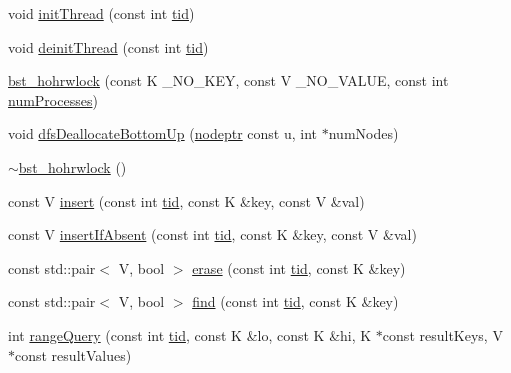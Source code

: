 \begin{DoxyCompactItemize}
\item 
void \hyperlink{classbst__hohrwlock__ns_1_1bst__hohrwlock_a594fc73b875a953bbbabe66ad1fd486f}{init\+Thread} (const int \hyperlink{microbench_2main_8cpp_a9ca9869868fe7e7a38a921cc7de4103f}{tid})
\item 
void \hyperlink{classbst__hohrwlock__ns_1_1bst__hohrwlock_a6238bfcad20d51e4b3522a51c9b41021}{deinit\+Thread} (const int \hyperlink{microbench_2main_8cpp_a9ca9869868fe7e7a38a921cc7de4103f}{tid})
\item 
\hyperlink{classbst__hohrwlock__ns_1_1bst__hohrwlock_a2971cc13e0041afd83bd6f0393b66e55}{bst\+\_\+hohrwlock} (const K \+\_\+\+N\+O\+\_\+\+K\+EY, const V \+\_\+\+N\+O\+\_\+\+V\+A\+L\+UE, const int \hyperlink{testing_8cpp_aa085812188e21ede75351d88b9b2c30d}{num\+Processes})
\item 
void \hyperlink{classbst__hohrwlock__ns_1_1bst__hohrwlock_a12610932b03346ccdbeeff626d8ad4a6}{dfs\+Deallocate\+Bottom\+Up} (\hyperlink{bst__rwlock__impl_8h_a04158d2a20768fe447133ff555823b05}{nodeptr} const u, int $\ast$num\+Nodes)
\item 
\hyperlink{classbst__hohrwlock__ns_1_1bst__hohrwlock_a2b5b098a27a55fdcf511c37e1f74fa1d}{$\sim$bst\+\_\+hohrwlock} ()
\item 
const V \hyperlink{classbst__hohrwlock__ns_1_1bst__hohrwlock_ab8ce8a65171af6b29e7b0c13004ff3f9}{insert} (const int \hyperlink{microbench_2main_8cpp_a9ca9869868fe7e7a38a921cc7de4103f}{tid}, const K \&key, const V \&val)
\item 
const V \hyperlink{classbst__hohrwlock__ns_1_1bst__hohrwlock_aff637e17bb37ffe790e7c644fff5ce7d}{insert\+If\+Absent} (const int \hyperlink{microbench_2main_8cpp_a9ca9869868fe7e7a38a921cc7de4103f}{tid}, const K \&key, const V \&val)
\item 
const std\+::pair$<$ V, bool $>$ \hyperlink{classbst__hohrwlock__ns_1_1bst__hohrwlock_ab3f51b453cc5cb462e9d78a9c0403ca3}{erase} (const int \hyperlink{microbench_2main_8cpp_a9ca9869868fe7e7a38a921cc7de4103f}{tid}, const K \&key)
\item 
const std\+::pair$<$ V, bool $>$ \hyperlink{classbst__hohrwlock__ns_1_1bst__hohrwlock_ab81a9b0759d366baddcbc300ea950a6d}{find} (const int \hyperlink{microbench_2main_8cpp_a9ca9869868fe7e7a38a921cc7de4103f}{tid}, const K \&key)
\item 
int \hyperlink{classbst__hohrwlock__ns_1_1bst__hohrwlock_a741882cdc7b3a31ad95132c194d89631}{range\+Query} (const int \hyperlink{microbench_2main_8cpp_a9ca9869868fe7e7a38a921cc7de4103f}{tid}, const K \&lo, const K \&hi, K $\ast$const result\+Keys, V $\ast$const result\+Values)

\end{DoxyCompactItemize}
